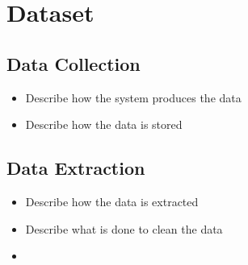 \chapter{Dataset}

\section{Data Collection}
\begin{itemize}
\item Describe how the system produces the data
\item Describe how the data is stored
\end{itemize}

\section{Data Extraction}
\begin{itemize}
\item Describe how the data is extracted
\item Describe what is done to clean the data
\item 
\end{itemize}
